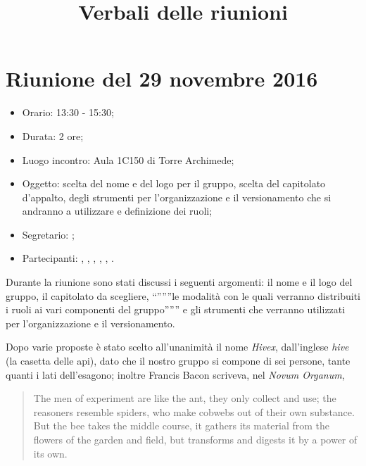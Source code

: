 


\author{\PB}
\supervisor{\GG}
\title{Verbali delle riunioni}



\maketitle



\section{Riunione del 29 novembre 2016}

\begin{itemize}
	\item Orario: 13:30 - 15:30;
	\item Durata: 2 ore;
	\item Luogo incontro: Aula 1C150 di Torre Archimede; 
	\item Oggetto: scelta del nome e del logo per il gruppo, scelta del capitolato d'appalto, degli strumenti per l'organizzazione e il versionamento che si andranno a utilizzare e definizione dei ruoli;
	\item Segretario: \LB; 
	\item Partecipanti: \AZ, \GG, \LB, \LS, \MM, \PB.
\end{itemize}

Durante la riunione sono stati discussi i seguenti argomenti: il nome e il logo del gruppo, il capitolato da scegliere, “”””le modalità con le quali verranno distribuiti i ruoli ai vari componenti del gruppo””” e gli strumenti che verranno utilizzati per l'organizzazione e il versionamento.

Dopo varie proposte è stato scelto all'unanimità il nome \textit{Hivex}, dall'inglese \textit{hive} (la casetta delle api), dato che il nostro gruppo si compone di sei persone, tante quanti i lati dell'esagono; inoltre Francis Bacon scriveva, nel \textit{Novum Organum},
\begin{quote}
	The men of experiment are like the ant, they only collect and use; the reasoners resemble spiders, who make cobwebs out of their own substance. But the bee takes the middle course, it gathers its material from the flowers of the garden and field, but transforms and digests it by a power of its own.
\end{quote}

